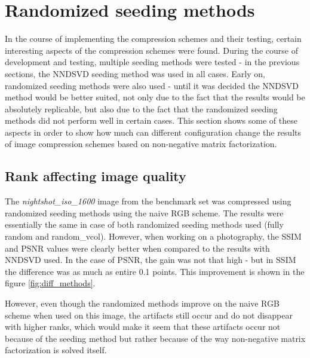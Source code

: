 \documentclass[thesis=M,english]{FITthesis}[2012/10/20]
\begin{document}
\section{Randomized seeding methods}
In the course of implementing the compression schemes and their testing, certain
interesting aspects of the compression schemes were found. During the course
of development and testing, multiple seeding methods were tested - in the previous
sections, the NNDSVD seeding method was used in all cases. Early on, randomized seeding
methods were also used - until it was decided the NNDSVD method would be better suited,
not only due to the fact that the results would be absolutely replicable, but also due to
the fact that the randomized seeding methods did not perform well in certain cases. This
section shows some of these aspects in order to show how much can different configuration
change the results of image compression schemes based on non-negative matrix
factorization.

\subsection{Rank affecting image quality}
The \emph{nightshot\_iso\_1600} image from the benchmark set was compressed using
randomized seeding methods using the naive RGB scheme. The results were essentially
the same in case of both randomized seeding methods used (fully random and
random\_vcol). However, when working on a photography, the SSIM and PSNR values
were clearly better when compared to the results with NNDSVD used. In the case of
PSNR, the gain was not that high - but in SSIM the difference was as much as entire
0.1 points. This improvement is shown in the figure \ref{fig:diff_methods}.

However, even though the randomized methods improve on the naive RGB scheme when
used on this image, the artifacts still occur and do not disappear with higher ranks,
which would make it seem that these artifacts occur not because of the seeding method
but rather because of the way non-negative matrix factorization is solved itself.
\end{document}
